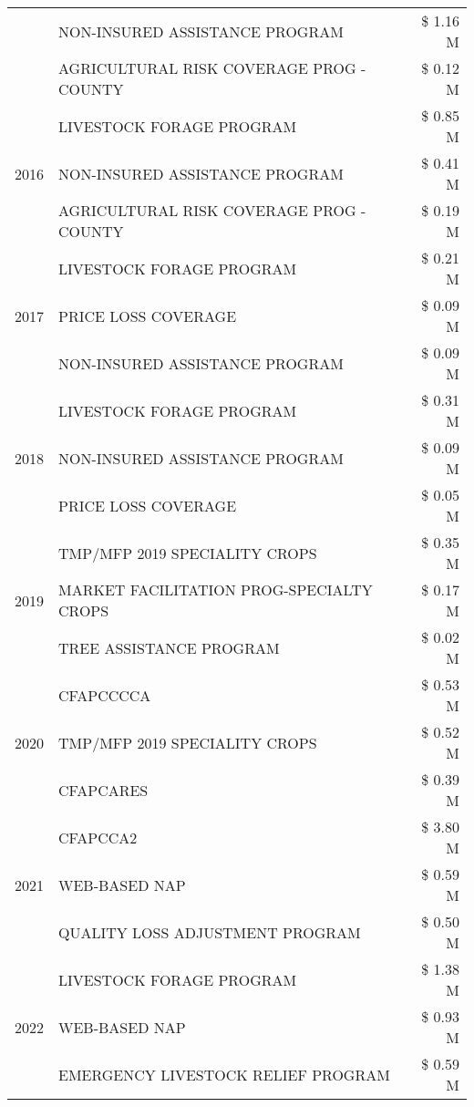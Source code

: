 \begin{tabular}{llr}
 & NON-INSURED ASSISTANCE PROGRAM & \$ 1.16 M \\
 & AGRICULTURAL RISK COVERAGE PROG - COUNTY & \$ 0.12 M \\
\cline{1-3}
\multirow[t]{3}{*}{2016} & LIVESTOCK FORAGE PROGRAM & \$ 0.85 M \\
 & NON-INSURED ASSISTANCE PROGRAM & \$ 0.41 M \\
 & AGRICULTURAL RISK COVERAGE PROG - COUNTY & \$ 0.19 M \\
\cline{1-3}
\multirow[t]{3}{*}{2017} & LIVESTOCK FORAGE PROGRAM & \$ 0.21 M \\
 & PRICE LOSS COVERAGE & \$ 0.09 M \\
 & NON-INSURED ASSISTANCE PROGRAM & \$ 0.09 M \\
\cline{1-3}
\multirow[t]{3}{*}{2018} & LIVESTOCK FORAGE PROGRAM & \$ 0.31 M \\
 & NON-INSURED ASSISTANCE PROGRAM & \$ 0.09 M \\
 & PRICE LOSS COVERAGE & \$ 0.05 M \\
\cline{1-3}
\multirow[t]{3}{*}{2019} & TMP/MFP 2019 SPECIALITY CROPS & \$ 0.35 M \\
 & MARKET FACILITATION PROG-SPECIALTY CROPS & \$ 0.17 M \\
 & TREE ASSISTANCE PROGRAM & \$ 0.02 M \\
\cline{1-3}
\multirow[t]{3}{*}{2020} & CFAPCCCCA & \$ 0.53 M \\
 & TMP/MFP 2019 SPECIALITY CROPS & \$ 0.52 M \\
 & CFAPCARES & \$ 0.39 M \\
\cline{1-3}
\multirow[t]{3}{*}{2021} & CFAPCCA2 & \$ 3.80 M \\
 & WEB-BASED NAP & \$ 0.59 M \\
 & QUALITY LOSS ADJUSTMENT PROGRAM & \$ 0.50 M \\
\cline{1-3}
\multirow[t]{3}{*}{2022} & LIVESTOCK FORAGE PROGRAM & \$ 1.38 M \\
 & WEB-BASED NAP & \$ 0.93 M \\
 & EMERGENCY LIVESTOCK RELIEF PROGRAM & \$ 0.59 M \\
\cline{1-3}
\bottomrule
\end{tabular}

